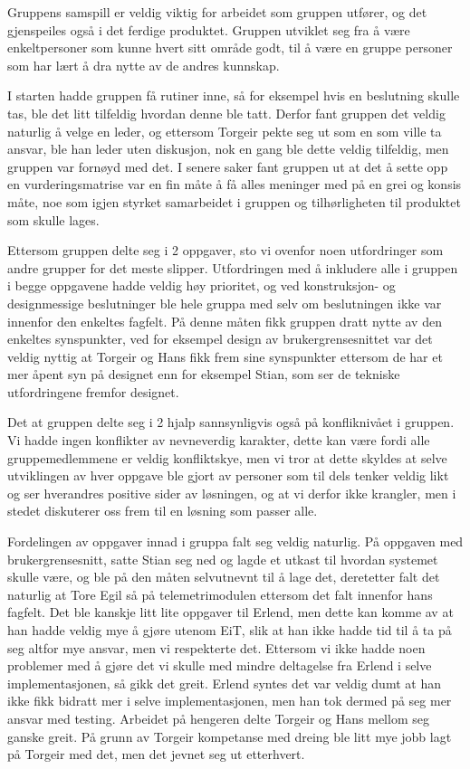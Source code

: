 Gruppens samspill er veldig viktig for arbeidet som gruppen utfører, og det gjenspeiles også i det ferdige produktet.
Gruppen utviklet seg fra å være enkeltpersoner som kunne hvert sitt område godt, til å være en gruppe personer som har lært å dra nytte av de andres kunnskap.

I starten hadde gruppen få rutiner inne, så for eksempel hvis en beslutning skulle tas, ble det litt tilfeldig hvordan denne ble tatt. Derfor fant gruppen det veldig naturlig å velge en leder, og ettersom Torgeir pekte seg ut som en som ville ta ansvar, ble han leder uten diskusjon, nok en gang ble dette veldig tilfeldig, men gruppen var fornøyd med det. I senere saker fant gruppen ut at det å sette opp en vurderingsmatrise var en fin måte å få alles meninger med på en grei og konsis måte, noe som igjen styrket samarbeidet i gruppen og tilhørligheten til produktet som skulle lages.

Ettersom gruppen delte seg i 2 oppgaver, sto vi ovenfor noen utfordringer som andre grupper for det meste slipper. Utfordringen med å inkludere alle i gruppen i begge oppgavene hadde veldig høy prioritet, og ved konstruksjon- og designmessige beslutninger ble hele gruppa med selv om beslutningen ikke var innenfor den enkeltes fagfelt. På denne måten fikk gruppen dratt nytte av den enkeltes synspunkter, ved for eksempel design av brukergrensesnittet var det veldig nyttig at Torgeir og Hans fikk frem sine synspunkter ettersom de har et mer åpent syn på designet enn for eksempel Stian, som ser de tekniske utfordringene fremfor designet.

Det at gruppen delte seg i 2 hjalp sannsynligvis også på konfliknivået i gruppen. Vi hadde ingen konflikter av nevneverdig karakter, dette kan være fordi alle gruppemedlemmene er veldig konfliktskye, men vi tror at dette skyldes at selve utviklingen av hver oppgave ble gjort av personer som til dels tenker veldig likt og ser hverandres positive sider av løsningen, og at vi derfor ikke krangler, men i stedet diskuterer oss frem til en løsning som passer alle.

Fordelingen av oppgaver innad i gruppa falt seg veldig naturlig. På oppgaven med brukergrensesnitt, satte Stian seg ned og lagde et utkast til hvordan systemet skulle være, og ble på den måten selvutnevnt til å lage det, deretetter falt det naturlig at Tore Egil så på telemetrimodulen ettersom det falt innenfor hans fagfelt. Det ble kanskje litt lite oppgaver til Erlend, men dette kan komme av at han hadde veldig mye å gjøre utenom EiT, slik at han ikke hadde tid til å ta på seg altfor mye ansvar, men vi respekterte det. Ettersom vi ikke hadde noen problemer med å gjøre det vi skulle med mindre deltagelse fra Erlend i selve implementasjonen, så gikk det greit. Erlend syntes det var veldig dumt at han ikke fikk bidratt mer i selve implementasjonen, men han tok dermed på seg mer ansvar med testing. Arbeidet på hengeren delte Torgeir og Hans mellom seg ganske greit. På grunn av Torgeir kompetanse med dreing ble litt mye jobb lagt på Torgeir med det, men det jevnet seg ut etterhvert.

